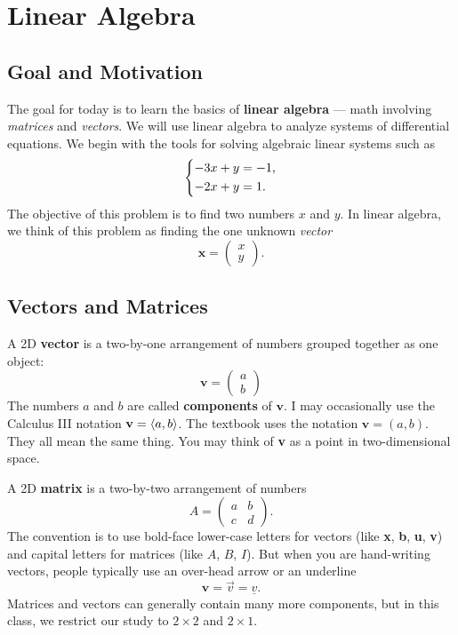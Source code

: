 \documentclass[10pt,letterpaper]{article}
\begin{document}
\section{Linear Algebra}

\subsection{Goal and Motivation}
The goal for today is to learn the basics of \textbf{linear algebra} — math involving \textit{matrices} and \textit{vectors}. We will use linear algebra to analyze systems of
differential equations. We begin with the tools
for solving algebraic linear systems such as
\[
\begin{dcases}
-3x+y=-1,\\
-2x+y=1.
\end{dcases}
\]
The objective of this problem is to find two numbers $x$ and $y$. In linear algebra, we think of this problem as finding the one unknown \textit{vector}
$$
    \textbf{x} = \begin{pmatrix}
        x\\y
    \end{pmatrix}.
$$

\subsection{Vectors and Matrices}
A 2D \textbf{vector} is a two-by-one arrangement of numbers grouped together as one object:
$$
    \textbf{v} = \begin{pmatrix}
        a\\b
    \end{pmatrix}
$$
The numbers $a$ and $b$ are called \textbf{components} of $\textbf{v}$.
I may occasionally use the Calculus III notation $\textbf{v}=\left\langle a,b\right\rangle$. The textbook uses the notation $\textbf{v}=(a,b)$. They all mean the same thing. You may think of \textbf{v} as a point in two-dimensional space.

A 2D \textbf{matrix} is a two-by-two arrangement of numbers
\[
A=
\begin{pmatrix}
a & b\\
c & d
\end{pmatrix}.
\]
The convention is to use bold-face lower-case letters for vectors (like \textbf{x}, \textbf{b}, \textbf{u}, \textbf{v}) and capital letters for matrices (like $A$, $B$, $I$). But when you are hand-writing vectors, people typically use an over-head arrow or an underline
$$
    \textbf{v} = \vec{v} = \underline{v}.
$$
Matrices and vectors can generally contain many more components, but in this class, we restrict our study to $2\times 2$ and $2\times 1$.
\end{document}
